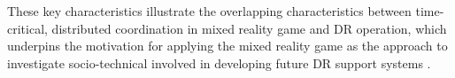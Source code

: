 These key characteristics illustrate the overlapping characteristics between time-critical, distributed coordination in mixed reality game and \ac{DR} operation, which underpins the motivation for applying the mixed reality game as the approach to investigate socio-technical involved in developing future \ac{DR} support systems \cite{Fischer2012}.\\








